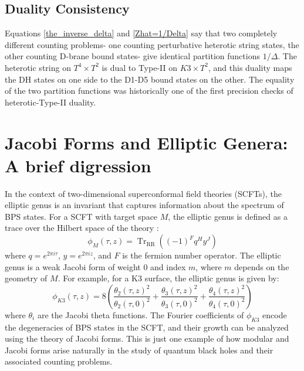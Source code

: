 \subsection{Duality Consistency}

Equations \eqref{the_inverse_delta} and \eqref{Zhat=1/Delta} say that two completely 
different counting problems- one counting perturbative heterotic string states, 
the other counting D-brane bound states- give identical partition functions 
$1/\Delta$. The heterotic string on $T^4 \times T^2$ is dual to Type-II on $K3 \times T^2$, 
and this duality maps the DH states on one side to the D1-D5 bound states on the 
other. The equality of the two partition functions was historically one of the 
first precision checks of heterotic-Type-II duality.

\section{Jacobi Forms and Elliptic Genera: A brief digression}
In the context of two-dimensional superconformal field theories (SCFTs), the elliptic genus is an invariant that captures information about the spectrum of BPS states. For a SCFT with target space $M$, the elliptic genus is defined as a trace over the Hilbert space of the theory \cite{DMZ}:
\begin{equation}
    \phi_M(\tau, z) = \operatorname{Tr}_{\text{RR}} \left( (-1)^F q^H y^J\right)
\end{equation}
where $q = e^{2\pi i \tau}$, $y = e^{2\pi i z}$, and $F$ is the fermion number operator. The elliptic genus is a weak Jacobi form of weight $0$ and index $m$, where $m$ depends on the geometry of $M$. For example, for a K3 surface, the elliptic genus is given by: \cite[Eq.~4.50]{DMZ}
\begin{equation}
    \phi_{K3}(\tau, z) = 8 \left( \frac{\theta_2(\tau, z)^2}{\theta_2(\tau, 0)^2} + \frac{\theta_3(\tau, z)^2}{\theta_3(\tau, 0)^2} + \frac{\theta_4(\tau, z)^2}{\theta_4(\tau, 0)^2} \right)
\end{equation}
where $\theta_i$ are the Jacobi theta functions. The Fourier coefficients of $\phi_{K3}$ encode the degeneracies of BPS states in the SCFT, and their growth can be analyzed using the theory of Jacobi forms. This is just one example of how modular and Jacobi forms arise naturally in the study of quantum black holes and their associated counting problems.